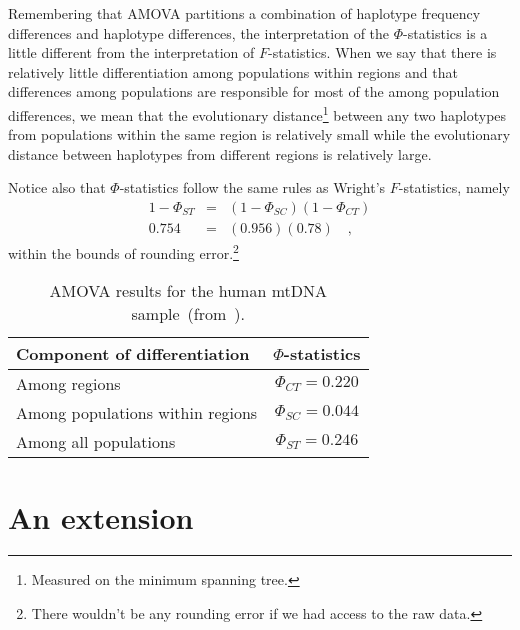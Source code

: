 \documentclass[12pt]{article}
\begin{document}
Remembering that AMOVA partitions a combination of haplotype frequency
differences and haplotype differences, the interpretation of the
$\Phi$-statistics is a little different from the interpretation of
$F$-statistics. When we say that there is relatively little
differentiation among populations within regions and that differences
among populations are responsible for most of the among population
differences, we mean that the evolutionary distance\footnote{Measured
  on the minimum spanning tree.} between any two haplotypes from
populations within the same region is relatively small while the
evolutionary distance between haplotypes from different regions is
relatively large.

Notice also that $\Phi$-statistics follow the same rules as Wright's
$F$-statistics, namely
\begin{eqnarray*}
1 - \Phi_{ST} &=& (1 - \Phi_{SC})(1 - \Phi_{CT}) \\
0.754 &=& (0.956)(0.78) \quad ,
\end{eqnarray*}
within the bounds of rounding error.\footnote{There wouldn't be any
  rounding error if we had access to the raw data.}

\begin{table}
\begin{center}
\begin{tabular}{lc}
\hline\hline
Component of differentiation     & $\Phi$-statistics \\
\hline
Among regions                    & $\Phi_{CT} = 0.220$ \\
Among populations within regions & $\Phi_{SC} = 0.044$ \\
Among all populations            & $\Phi_{ST} = 0.246$ \\
\hline
\end{tabular}
\end{center}
\caption{AMOVA results for the human mtDNA
  sample~(from~\cite{Excoffier-etal92}).}\label{table:amova-results}
\end{table}

\section*{An extension}
\end{document}

